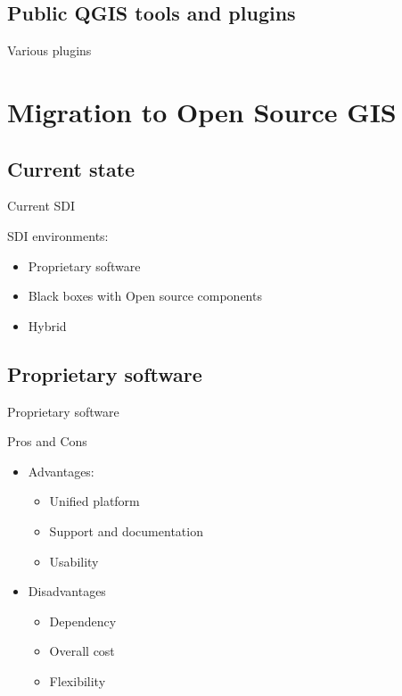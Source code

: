 \subsection{Public QGIS tools and plugins}
\begin{frame}{Various plugins}
\end{frame}

\section{Migration to Open Source GIS}
\subsection{Current state}
\begin{frame}{Current SDI}
	\begin{block}{SDI environments:}
		\begin{itemize}
			\item Proprietary software
			\item Black boxes with Open source components
			\item Hybrid
		\end{itemize}
	\end{block}
\end{frame}

\subsection{Proprietary software}
\begin{frame}{Proprietary software}
	\begin{block}{Pros and Cons}
		\begin{itemize}
			\item Advantages:
			\begin{itemize}
				\item Unified platform
				\item Support and documentation
				\item Usability
			\end{itemize}
			\item Disadvantages
			\begin{itemize}
				\item Dependency
				\item Overall cost
				\item Flexibility
			\end{itemize}
		\end{itemize}
	\end{block}
\end{frame}

